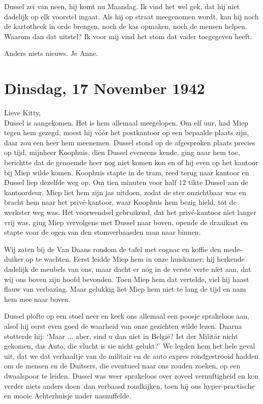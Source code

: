 \documentclass{book}
\begin{document}
Dussel zei van neen, hij komt nu Maandag. Ik vind het wel gek, dat hij niet
dadelijk op elk voorstel ingaat. Als hij op straat meegenomen wordt, kan hij
noch de kartotheek in orde brengen, noch de kas opmaken, noch de mensen helpen.
Waarom dan dat uitstel? Ik voor mij vind het stom dat vader toegegeven heeft.

Anders niets nieuws. Je Anne.

\section*{Dinsdag, 17 November 1942}

Lieve Kitty,\\
Dussel is aangekomen. Het is hem allemaal meegelopen. Om elf uur,
had Miep tegen hem gezegd, moest hij vóór het postkantoor op een bepaalde plaats
zijn, daar zou een heer hem meenemen. Dussel stond op de afgesproken plaats
precies op tijd, mijnheer Koophuis, dien Dussel eveneens kende, ging naar hem
toe, berichtte dat de genoemde heer nog niet komen kon en of hij even op het
kantoor bij Miep wilde komen. Koophuis stapte in de tram, reed terug naar
kantoor en Dussel liep dezelfde weg op. Om tien minuten voor half 12 tikte
Dussel aan de kantoordeur. Miep liet hem zijn jas uitdoen, zodat de ster
onzichtbaar was en bracht hem naar het privé-kantoor, waar Koophuis hem bezig
hield, tot de werkster weg was.  Het voorwendsel gebruikend, dat het
privé-kantoor niet langer vrij was, ging Miep vervolgens met Dussel naar boven,
opende de draaikast en stapte voor de ogen van den stomverbaasden man naar
binnen.

Wij zaten bij de Van Daans rondom de tafel met cognac en koffie den mede-duiker
op te wachten. Eerst leidde Miep hem in onze huiskamer; hij herkende dadelijk de
meubels van ons, maar dacht er nog in de verste verte niet aan, dat wij ons
boven zijn hoofd bevonden. Toen Miep hem dat vertelde, viel hij haast flauw van
verbazing. Maar gelukkig liet Miep hem niet te lang de tijd en nam hem mee naar
boven.

Dussel plofte op een stoel neer en keek ons allemaal een poosje sprakeloos aan,
alsof hij eerst even goed de waarheid van onze gezichten wilde lezen. Daarna
stotterde hij: `Maar ... aber, sind u dan niet in België? Ist der Militär nicht
gekomen, das Auto, die vlucht is sie nicht gelukt?' We legden hem het hele geval
uit, dat we dat verhaaltje van de militair en de auto expres rondgestrooid
hadden om de mensen en de Duitsers, die eventueel naar ons zouden zoeken, op een
dwaalspoor te leiden. Dussel was weer sprakeloos over zoveel vernuftigheid en
kon verder niets anders doen~dan verbaasd rondkijken, toen hij ons
hyper-practische en mooie Achterhuisje nader nasnuffelde.
\end{document}
